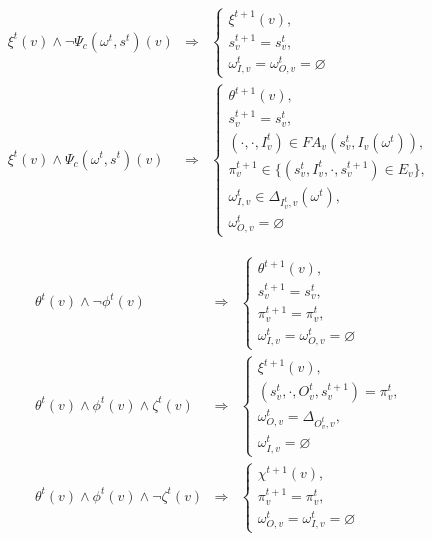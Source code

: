 \documentclass[10pt,a4paper]{article}
\newcommand{\FA}{F\!A}
\begin{document}
\begin{eqnarray}
  \xi^t(v) \wedge \neg \Psi_c(\omega^t, s^t)(v) & \Rightarrow &
    \begin{cases}
      \xi^{t + 1}(v), \\
      s^{t + 1}_v = s^t_v, \\
      \omega^t_{I, v} = \omega^t_{O, v} = \varnothing
    \end{cases} \label{freetofree} \\
  \xi^t(v) \wedge \Psi_c(\omega^t, s^t)(v) & \Rightarrow &
    \begin{cases}
      \theta^{t + 1}(v), \\
      s^{t + 1}_v = s^t_v, \\
      (\cdot, \cdot, I^t_v) \in \FA_v(s^{t}_v, I_v(\omega^t)), \\
      \pi^{t + 1}_v \in \{ (s^t_v, I^t_v, \cdot, s^{t + 1}_v) \in E_v\}, \\
      \omega^t_{I, v} \in \Delta_{I^t_v, v}(\omega^t), \\
      \omega^t_{O, v} = \varnothing
    \end{cases} \label{freetostart}
\end{eqnarray}

\begin{eqnarray}
  \theta^t(v) \wedge \neg \phi^t(v) & \Rightarrow &
   \begin{cases}
     \theta^{t + 1}(v), \\
     s^{t + 1}_v = s^t_v, \\
     \pi^{t + 1}_v = \pi^t_v, \\
     \omega^t_{I, v} = \omega^t_{O, v} = \varnothing
   \end{cases} \label{worktowork} \\
  \theta^t(v) \wedge \phi^t(v) \wedge \zeta^t(v) & \Rightarrow &
    \begin{cases}
      \xi^{t + 1}(v), \\
      (s^t_v, \cdot, O^t_v, s^{t + 1}_v) = \pi^t_v, \\
      \omega^t_{O, v} = \Delta_{O^t_v, v}, \\
      \omega^t_{I, v} = \varnothing
    \end{cases} \label{worktofree}\\
  \theta^t(v) \wedge \phi^t(v) \wedge \neg \zeta^t(v) & \Rightarrow &
    \begin{cases}
      \chi^{t + 1}(v),\\
      \pi^{t + 1}_v = \pi^t_v, \\
      \omega^t_{O, v} = \omega^t_{I, v} = \varnothing
    \end{cases} \label{worktoblock}
\end{eqnarray}
\end{document}
